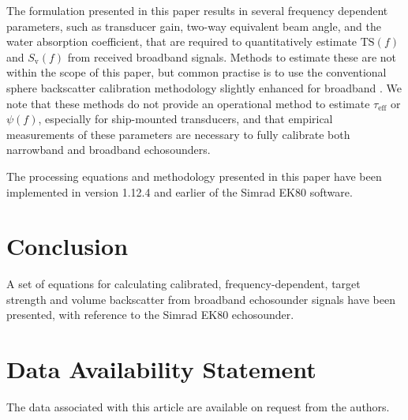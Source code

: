 \documentclass[preprint,12pt,TurnOnLineNumbers]{JASAnew}
\newcommand{\ek}{Simrad EK80}
\newcommand{\freqsym}{f}
\newcommand{\teff}{\tau_{\textrm{eff}}}
\newcommand{\ts}{\textrm{TS}}
\newcommand{\sv}{S_{\textrm{v}}}
\newcommand{\eqang}{\psi}
\begin{document}
The formulation presented in this paper results in several frequency dependent parameters, such as transducer gain, two-way equivalent beam angle, and the water absorption coefficient, that are required to quantitatively estimate $\ts(\freqsym)$ and $\sv(\freqsym)$ from received broadband signals. Methods to estimate these are not within the scope of this paper, but common practise is to use the conventional sphere backscatter calibration methodology \citep{demerCalibrationAcousticInstruments2015} slightly enhanced for broadband \citep{hobaekCharacterizationTargetSpheres2013, lavery2017}. We note that these methods do not provide an operational method to estimate $\teff$ or $\eqang(\freqsym)$, especially for ship-mounted transducers, and that empirical measurements of these parameters are necessary to fully calibrate both narrowband and broadband echosounders.

The processing equations and methodology presented in this paper have been implemented in version 1.12.4 and earlier of the \ek{} software.

\section{Conclusion}

A set of equations for calculating calibrated, frequency-dependent, target strength and volume backscatter from broadband echosounder signals have been presented, with reference to the \ek{} echosounder.

\section{Data Availability Statement}

The data associated with this article are available on request from the authors.


\end{document}
